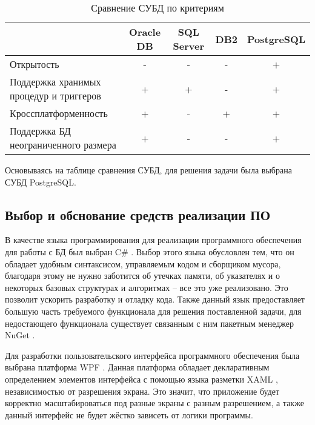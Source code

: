 \documentclass{bmstu}
\begin{document}
\begin{table}[H]
	\caption{Сравнение СУБД по критериям}
	\begin{center}
		\begin{tabular}{| p{5 cm} | c | c | c | c |} 
			\hline
			
			\textbf{} & \textbf{Oracle DB} & \textbf{SQL Server} & \textbf{DB2} & \textbf{PostgreSQL} \\  
			
			\hline
			
			Открытость & - & - & - & + \\
			
			\hline
			
			Поддержка хранимых процедур и триггеров & + & + & - & + \\
			
			\hline
			
			Кроссплатформенность & + & - & + & + \\
			
			\hline
			
			Поддержка БД неограниченного размера & + & - & - & + \\
			
			\hline
		\end{tabular}
	\end{center}
\end{table}

Основываясь на таблице сравнения СУБД, для решения задачи была выбрана СУБД PostgreSQL.

\subsection*{Выбор и обснование средств реализации ПО}

В качестве языка программирования для реализации программного обеспечения для работы с БД был выбран C\# \cite{c_sharp}. Выбор этого языка обусловлен тем, что он обладает удобным синтаксисом, управляемым кодом и сборщиком мусора, благодаря этому не нужно заботится об утечках памяти, об указателях и о некоторых базовых структурах и алгоритмах -- все это уже реализовано. Это позволит ускорить разработку и отладку кода. Также данный язык предоставляет большую часть требуемого функционала для решения поставленной задачи, для недостающего функционала существует связанным с ним пакетным менеджер NuGet \cite{nuget}.

Для разработки пользовательского интерфейса программного обеспечения была выбрана платформа WPF \cite{wpf}. Данная платформа обладает декларативным определением элементов интерфейса с помощью языка разметки XAML \cite{xaml}, независимостью от разрешения экрана. Это значит, что приложение будет корректно масштабироваться под разные экраны с разным разрешением, а также данный интерфейс не будет жёстко зависеть от логики программы.
\end{document}
